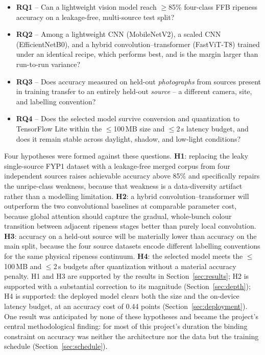 \documentclass{article}
\begin{document}
\begin{itemize}
  \item \textbf{RQ1} -- Can a lightweight vision model reach $\geq$85\% four-class FFB ripeness accuracy
  on a leakage-free, multi-source test split?
  \item \textbf{RQ2} -- Among a lightweight CNN (MobileNetV2), a scaled CNN (EfficientNetB0), and a
  hybrid convolution--transformer (FastViT-T8) trained under an identical recipe, which performs best,
  and is the margin larger than run-to-run variance?
  \item \textbf{RQ3} -- Does accuracy measured on held-out \textit{photographs} from sources present in
  training transfer to an entirely held-out \textit{source} -- a different camera, site, and labelling
  convention?
  \item \textbf{RQ4} -- Does the selected model survive conversion and quantization to TensorFlow Lite
  within the $\leq$100\,MB size and $\leq$2\,s latency budget, and does it remain stable across daylight,
  shadow, and low-light conditions?
\end{itemize}

Four hypotheses were formed against these questions. \textbf{H1}: replacing the leaky single-source FYP1
dataset with a leakage-free merged corpus from four independent sources raises achievable accuracy above
85\% and specifically repairs the unripe-class weakness, because that weakness is a data-diversity
artifact rather than a modelling limitation. \textbf{H2}: a hybrid convolution--transformer will
outperform the two convolutional baselines at comparable parameter cost, because global attention should
capture the gradual, whole-bunch colour transition between adjacent ripeness stages better than purely
local convolution. \textbf{H3}: accuracy on a held-out source will be materially lower than accuracy on
the main split, because the four source datasets encode different labelling conventions for the same
physical ripeness continuum. \textbf{H4}: the selected model meets the $\leq$100\,MB and $\leq$2\,s
budgets after quantization without a material accuracy penalty. H1 and H3 are supported by the results in
Section~\ref{sec:results}; H2 is supported with a substantial correction to its magnitude
(Section~\ref{sec:depth}); H4 is supported: the deployed model clears both the size and the
on-device latency budget, at an accuracy cost of 0.44 points (Section~\ref{sec:deployment}). One result was anticipated by none of these hypotheses and became the
project's central methodological finding: for most of this project's duration the binding constraint on
accuracy was neither the architecture nor the data but the training schedule
(Section~\ref{sec:schedule}).
\end{document}
